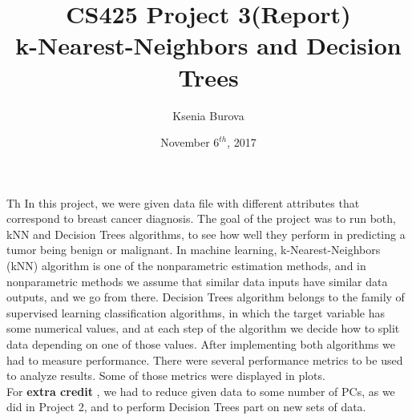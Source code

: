 \documentclass[12pt, letterpaper]{article}
\title{CS425 Project 3(Report)\\k-Nearest-Neighbors and Decision Trees}
\author{Ksenia Burova}
\date{November \(6^{th}\), 2017}
\begin{document}
\maketitle

{ Th In this project, we were given data file with different attributes that correspond to breast cancer diagnosis. The goal of the project was to run both, kNN and Decision Trees algorithms, to see how well they perform in predicting a tumor being benign or malignant. In machine learning, k-Nearest-Neighbors (kNN) algorithm is one of the nonparametric estimation methods, and in nonparametric methods we assume that similar data inputs have similar data outputs, and we go from there. Decision Trees algorithm belongs to the family of supervised learning classification algorithms, in which the target variable has some numerical values, and at each step of the algorithm we decide how to split data depending on one of those values. After implementing both algorithms we had to measure performance. There were several performance metrics to be used to analyze results. Some of those metrics were displayed in plots. \\
For {\bf  extra credit }, we had to reduce given data to some number of PCs, as we did in Project 2, and to perform Decision Trees part on new sets of data. }
\end{document}
